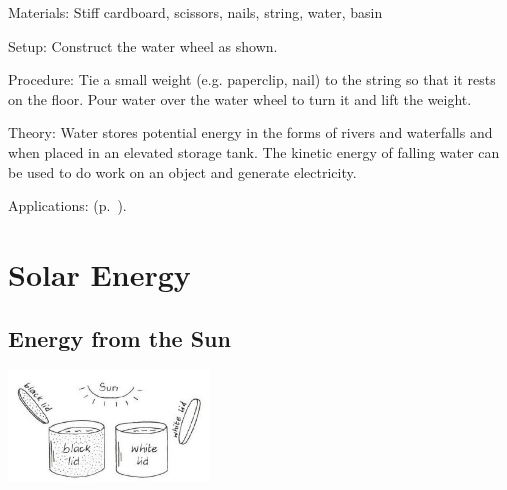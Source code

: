 \begin{multicols}{2}
\begin{description*}
\item[Materials:]{Stiff cardboard, scissors, nails, string, water, basin}
\item[Setup:]{Construct the water wheel as shown.}
\item[Procedure:]{Tie a small weight (e.g. paperclip, nail) to the string so that it rests on the floor. Pour water over the water wheel to turn it and lift the weight. }
\item[Theory:]{Water stores potential energy in the forms of rivers and waterfalls and when placed in an elevated storage tank. The kinetic energy of falling water can be used to do work on an object and generate electricity.}
\item[Applications:]{ (p.~\pageref{sub:water-turbine}).}
\end{description*}

\columnbreak


\section*{Solar Energy} 


\subsection{Energy from the Sun}

\begin{center}
\includegraphics[width=0.4\textwidth]{./img/vso/solar-heat.jpg}
\end{center}


\end{multicols}

